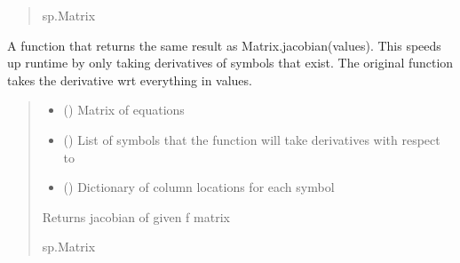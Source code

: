 \documentclass[letterpaper,10pt,english]{sphinxmanual}
\begin{document}
\begin{fulllineitems}
\begin{fulllineitems}
\begin{quote}
\begin{description}
\sphinxAtStartPar
sp.Matrix

\end{description}\end{quote}

\end{fulllineitems}


\begin{fulllineitems}
\label{\detokenize{src.sensitivity.faster_sensitivity:src.sensitivity.faster_sensitivity.SensitivityMatrix.new_jacobian}}
\pysigstartsignatures
\pysiglinewithargsret
{}
{\sphinxparamcomma {}\sphinxparamcomma {}}
{}
\pysigstopsignatures
\sphinxAtStartPar
A function that returns the same result as Matrix.jacobian(values).
This speeds up runtime by only taking derivatives of symbols that exist.
The original function takes the derivative wrt everything in values.
\begin{quote}\begin{description}
\begin{itemize}
\item {} 
\sphinxAtStartPar
{} () \textendash{} Matrix of equations

\item {} 
\sphinxAtStartPar
{} () \textendash{} List of symbols that the function will take derivatives with respect to

\item {} 
\sphinxAtStartPar
{} () \textendash{} Dictionary of column locations for each symbol

\end{itemize}

\sphinxAtStartPar
Returns jacobian of given f matrix

\sphinxAtStartPar
sp.Matrix

\end{description}\end{quote}

\end{fulllineitems}


\end{fulllineitems}
\end{document}
